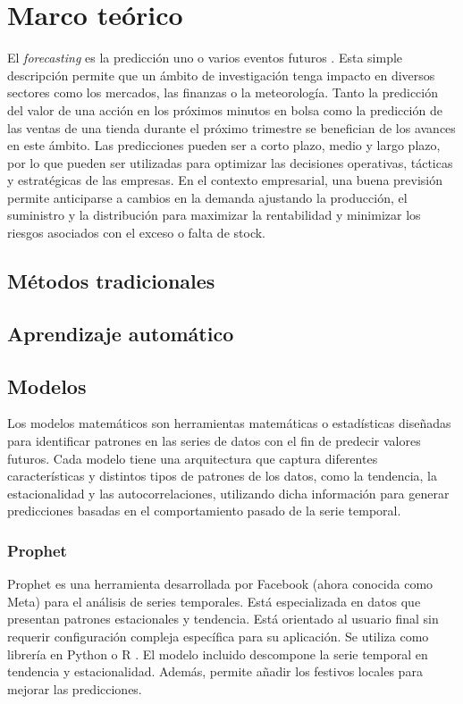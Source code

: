 \chapter{Marco teórico}\label{cap2}

El \textit{forecasting} es la predicción uno o varios eventos futuros \cite{intro}. Esta simple descripción permite que un ámbito de investigación tenga impacto en diversos sectores como los mercados, las finanzas o la meteorología. Tanto la predicción del valor de una acción en los próximos minutos en bolsa como la predicción de las ventas de una tienda durante el próximo trimestre se benefician de los avances en este ámbito. Las predicciones pueden ser a corto plazo, medio y largo plazo, por lo que pueden ser utilizadas para optimizar las decisiones operativas, tácticas y estratégicas de las empresas. En el contexto empresarial, una buena previsión permite anticiparse a cambios en la demanda ajustando la producción, el suministro y la distribución para maximizar la rentabilidad y minimizar los riesgos asociados con el exceso o falta de stock. 

\section{Métodos tradicionales}

\section{Aprendizaje automático}


\section{Modelos}

Los modelos matemáticos son herramientas matemáticas o estadísticas diseñadas para identificar patrones en las series de datos con el fin de predecir valores futuros. Cada modelo tiene una arquitectura que captura diferentes características y distintos tipos de patrones de los datos, como la tendencia, la estacionalidad y las autocorrelaciones, utilizando dicha información para generar predicciones basadas en el comportamiento pasado de la serie temporal.

\subsection{Prophet}

Prophet \cite{prophet} es una herramienta desarrollada por Facebook (ahora conocida como Meta) para el análisis de series temporales. Está especializada en datos que presentan patrones estacionales y tendencia. Está orientado al usuario final sin requerir configuración compleja específica para su aplicación. Se utiliza como librería en Python o R \cite{R}. El modelo incluido descompone la serie temporal en tendencia y estacionalidad. Además, permite añadir los festivos locales para mejorar las predicciones.

